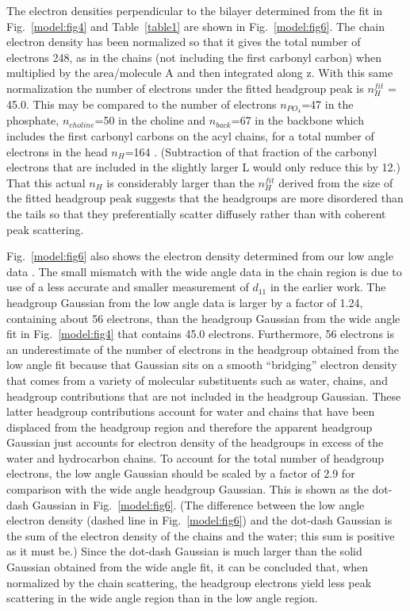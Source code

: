 The electron densities perpendicular to the bilayer
determined from the fit in Fig.\ \ref{model:fig4} and Table\ \ref{table1} are shown 
in Fig.\ \ref{model:fig6}.  
The chain electron density has been normalized so that it gives
the total number of electrons 248, as in the chains (not including the 
first carbonyl carbon) when multiplied by the area/molecule A and then
integrated along z.  With this same normalization the number of electrons under 
the fitted headgroup peak is $n_{H}^{fit}$ = 45.0.
This may be compared to the number of electrons $n_{{PO_{4}}}$=47 in the phosphate,
$n_{choline}$=50 in the choline and $n_{back}$=67 in the backbone which
includes the first carbonyl carbons on the acyl chains, for a total number of
electrons in the head $n_{H}$=164 .  (Subtraction of that fraction of the
carbonyl electrons that are included in the slightly larger L would only
reduce this by 12.)  That this actual
$n_{H}$ is considerably larger than the $n_{H}^{fit}$ 
derived from the size of the fitted headgroup peak
suggests that the headgroups are more disordered than the tails so that
they preferentially scatter diffusely rather than with coherent peak scattering.

Fig.\ \ref{model:fig6} also shows the electron density determined from our low
angle data \cite{WSN89}.  The small mismatch with the wide angle
data in the chain region is due to use of a less accurate and
smaller measurement of ${d_{11}}$ in the earlier work.
The headgroup Gaussian from the
low angle data is larger by a factor of 1.24, containing about 56 electrons,
than the headgroup Gaussian from the wide angle fit in Fig.\ \ref{model:fig4} that contains
45.0 electrons.  Furthermore, 
56 electrons is an underestimate of the number of electrons in the headgroup
obtained from the low angle fit
because that Gaussian sits on a smooth ``bridging'' electron density
that comes from a variety of molecular substituents such as water,
chains, and headgroup contributions that are not included
in the headgroup Gaussian.  These latter headgroup contributions account
for water and chains that have been displaced from the headgroup
region and therefore the apparent headgroup Gaussian just accounts for electron
density of the headgroups in excess of the water and hydrocarbon chains.
To account for the total number of headgroup electrons,
the low angle Gaussian should be scaled by a factor of 2.9
for comparison with the wide angle headgroup Gaussian.
This is shown as the dot-dash Gaussian in Fig.\ \ref{model:fig6}.
(The difference between the low angle electron density (dashed line
in Fig.\ \ref{model:fig6}) and the dot-dash Gaussian is the sum of the electron density of
the chains and the water; this sum is positive as it must be.)
Since the dot-dash Gaussian is much larger than the solid Gaussian obtained
from the wide angle fit, it can be concluded that,
when normalized by the chain scattering,
the headgroup electrons yield less peak scattering
in the wide angle region than in the low angle region.

